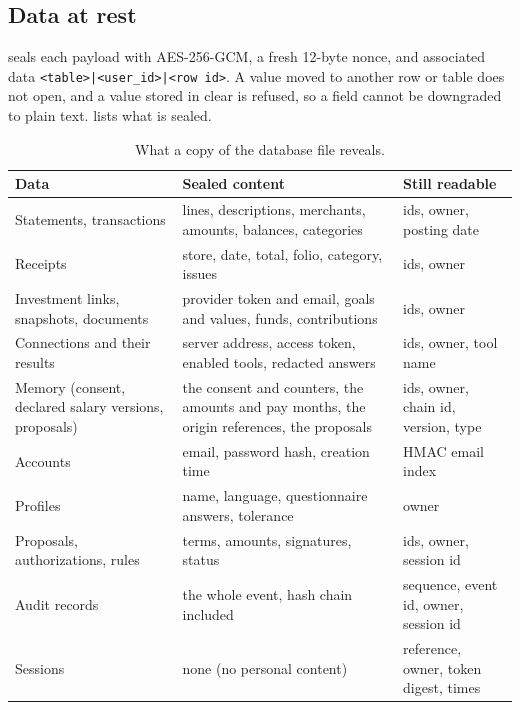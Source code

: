 \documentclass[11pt,a4paper]{article}
\begin{document}
\subsection{Data at rest}

 seals each payload with AES-256-GCM, a fresh 12-byte nonce, and
associated data \texttt{<table>|<user\_id>|<row id>}. A value moved to another row or table does not open, and a value
stored in clear is refused, so a field cannot be downgraded to plain text.  lists what is sealed.

\begin{table}[htbp]
  \centering
  \small
  \begin{tabularx}{\linewidth}{@{}>{\raggedright\arraybackslash}p{40mm}X>{\raggedright\arraybackslash}p{30mm}@{}}
    \toprule
    Data & Sealed content & Still readable \\
    \midrule
    Statements, transactions & lines, descriptions, merchants, amounts, balances, categories & ids, owner, posting date \\
    Receipts & store, date, total, folio, category, issues & ids, owner \\
    Investment links, snapshots, documents & provider token and email, goals and values, funds, contributions & ids, owner \\
    Connections and their results & server address, access token, enabled tools, redacted answers & ids, owner, tool name \\
    Memory (consent, declared salary versions, proposals) & the consent and counters, the amounts and pay months, the origin references, the proposals & ids, owner, chain id, version, type \\
    Accounts & email, password hash, creation time & HMAC email index \\
    Profiles & name, language, questionnaire answers, tolerance & owner \\
    Proposals, authorizations, rules & terms, amounts, signatures, status & ids, owner, session id \\
    Audit records & the whole event, hash chain included & sequence, event id, owner, session id \\
    Sessions & none (no personal content) & reference, owner, token digest, times \\
    \bottomrule
  \end{tabularx}
  \caption{What a copy of the database file reveals.}\label{tab:atrest}
\end{table}
\end{document}
